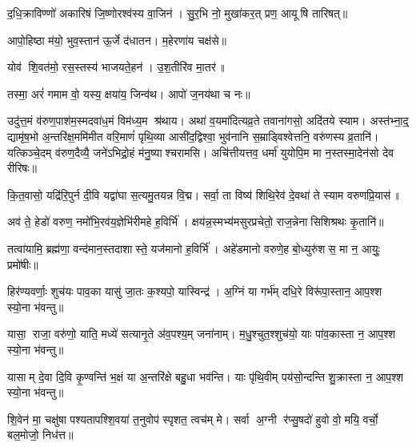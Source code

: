 द॒धि॒क्राविण्णो॑ अकारिषं जि॒ष्णोरश्व॑स्य वा॒जिन॑।
सु॒र॒भि नो॒ मुखा॑कर॒त् प्रण॒ आयूषि तारिषत्॥

आपो॒हिष्ठा म॑यो॒ भुव॒स्तान॑ ऊ॒र्जे द॑धातन। म॒हेरणा॑य चक्ष॑से॥

योव॑ शि॒वत॑मो॒ रस॒स्तस्य॑ भाजयते॒हन॑। उ॒श॒तीरि॑व मा॒तर॑॥

तस्मा॒ अरं॑ गमाम वो॒ यस्य॒ क्षया॑य॒ जिन्व॑थ। आपो॑ ज॒नय॑था च नः॥

उदु॑त्त॒मं व॑रुण॒पाश॑म॒स्मदवा॑ध॒मं विम॑ध्य॒म श्र॑थाय।
अथा॑ व॒यमा॑दित्यव्र॒ते तवाना॑गसो॒ अदि॑तये स्याम।
अस्त॑भ्ना॒द्॒ द्यामृ॑ष॒भो अ॒न्तरि॑क्ष॒ममि॑मीत वरि॒माणं॑ पृथि॒व्या
आसी॑द॒द्विश्वा॒ भुव॑नानि स॒म्राड्विश्वेत्तनि॒ वरु॑णस्य व्र॒तानि॑।
यत्किञ्चे॒दम् व॑रुण॒दैव्यै॒ जने॑ऽभिद्रो॒हं म॑नु॒ष्याश्चरामसि।
अचि॑त्तीयत्तव॒ धर्मा॑ युयोपि॒म मा न॒स्तस्मा॒देन॑सो देव रीरिषः॥

कि॒त॒वासो॒ यद्रि॑रि॒पुर्न दी॒वि यद्वा॑घा स॒त्यमु॒तयन्न वि॒द्म।
सर्वा॒ ता विष्य॑ शिथि॒रेव॑ दे॒वथा॑ ते स्याम वरुणप्रि॒यास॑॥

अव॑ ते॒ हेडो॑ वरुण॒ नमो॑भि॒रव॑य॒ज्ञेभि॑रीमहे ह॒विर्भि॑।
क्षय॑न्न॒स्मभ्य॑मसुरप्रचेतो॒ राज॒न्नेनासिशिश्रथः कृ॒तानि॑॥

तत्वा॑यामि॒ ब्रह्म॑णा॒ वन्द॑मान॒स्तदाशास्ते॒ यज॑मानो ह॒विर्भि॑।
अहे॑डमानो वरुणे॒ह बो॒ध्युरु॑शस॒ मा न॒ आयुः॒ प्रमो॑षीः॥

हिर॑ण्यवर्णाः॒ शुच॑यः पाव॒का यासु॑ जा॒तः क॒श्यपो॒ यास्विन्द्र॑।
अ॒ग्निं या गर्भ॑म् दधि॒रे विरू॑पा॒स्तान॒ आप॒श्श स्यो॒ना भ॑वन्तु॥

यासा॒ राजा॒ वरु॑णो॒ याति॒ मध्ये॑ सत्यानृ॒ते अ॑व॒पश्य॒म् जना॑नाम्।
म॒धु॒श्चुत॒श्शुच॑यो॒ याः पा॑व॒कास्ता न॒ आप॒श्श स्यो॒ना भ॑वन्तु॥

यासाम् दे॒वा दि॒वि कृ॒ण्वन्ति॑ भ॒क्षं या अ॒न्तरि॑क्षे बहु॒धा भव॑न्ति।
याः पृ॑थि॒वीम् पय॑सो॒न्दन्ति शु॒क्रास्ता न॒ आप॒श्श स्यो॒ना भ॑वन्तु॥

शि॒वेन॑ मा॒ चक्षु॑षा पश्यतापश्शि॒वया॑ त॒नुवोप॑ स्पृशत॒ त्वच॑म् मे।
सर्वा अ॒ग्नी र॑प्सु॒षदो॑ हुवो वो॒ मयि॒ वर्चो॒ बल॒मोजो॒ निध॑त्त॥

